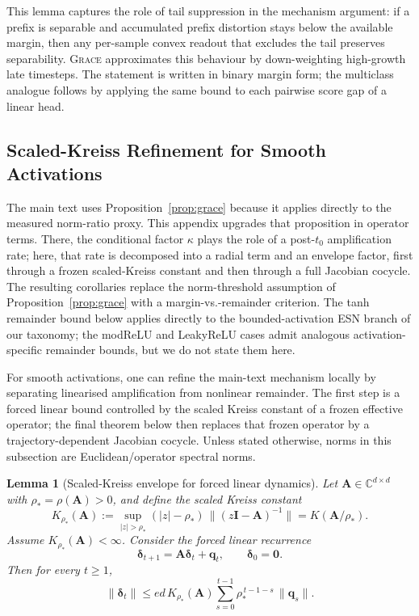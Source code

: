 \documentclass{article}
\newtheorem{lemma}[theorem]{Lemma}
\theoremstyle{remark}
\newcommand{\C}{\mathbb{C}}
\newcommand{\grace}{\textnormal{\textsc{Grace}}}
\begin{document}
This lemma captures the role of tail suppression in the mechanism argument:
if a prefix is separable and accumulated prefix distortion stays below the
available margin, then any per-sample convex readout that excludes the tail
preserves separability. \grace{} approximates this behaviour by
down-weighting high-growth late timesteps. The statement is written in binary
margin form; the multiclass analogue follows by applying the same bound to
each pairwise score gap of a linear head.

\subsection{Scaled-Kreiss Refinement for Smooth Activations}
\label{app:kreiss_refinement}

The main text uses Proposition~\ref{prop:grace} because it applies directly to
the measured norm-ratio proxy. This appendix upgrades that proposition in
operator terms. There, the conditional factor $\kappa$ plays the role of a
post-$t_0$ amplification rate; here, that rate is decomposed into a radial term
and an envelope factor, first through a frozen scaled-Kreiss constant and then
through a full Jacobian cocycle. The resulting corollaries replace the
norm-threshold assumption of Proposition~\ref{prop:grace} with a
margin-vs.-remainder criterion. The tanh remainder bound below applies
directly to the bounded-activation ESN branch of our taxonomy; the modReLU and
LeakyReLU cases admit analogous activation-specific remainder bounds, but we do
not state them here.

For smooth activations, one can refine the main-text mechanism locally by
separating linearised amplification from nonlinear remainder. The first step is
a forced linear bound controlled by the scaled Kreiss constant of a frozen
effective operator; the final theorem below then replaces that frozen operator
by a trajectory-dependent Jacobian cocycle. Unless stated otherwise, norms in
this subsection are Euclidean/operator spectral norms.

\begin{lemma}[Scaled-Kreiss envelope for forced linear dynamics]
\label{lemma:scaled_kreiss}
Let $\mathbf{A} \in \C^{d \times d}$ with $\rho_\ast = \rho(\mathbf{A}) > 0$, and define
the scaled Kreiss constant
\begin{equation}
  K_{\rho_\ast}(\mathbf{A})
  := \sup_{|z| > \rho_\ast} (|z| - \rho_\ast)\,\|(z\mathbf{I} - \mathbf{A})^{-1}\|
  = K(\mathbf{A}/\rho_\ast).
\end{equation}
Assume $K_{\rho_\ast}(\mathbf{A})<\infty$.
Consider the forced linear recurrence
\[
  \boldsymbol{\delta}_{t+1} = \mathbf{A} \boldsymbol{\delta}_t + \mathbf{q}_t,
  \qquad \boldsymbol{\delta}_0 = \mathbf{0}.
\]
Then for every $t \geq 1$,
\begin{equation}
  \|\boldsymbol{\delta}_t\|
  \leq e d\,K_{\rho_\ast}(\mathbf{A})
  \sum_{s=0}^{t-1} \rho_\ast^{\,t-1-s}\,\|\mathbf{q}_s\|.
  \label{eq:scaled_kreiss_forced}
\end{equation}
\end{lemma}
\end{document}
